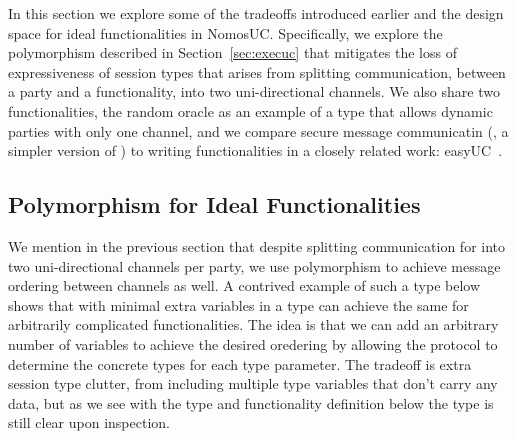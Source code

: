 In this section we explore some of the tradeoffs introduced earlier and the design space for ideal functionalities in NomosUC.
Specifically, we explore the polymorphism described in Section~\ref{sec:execuc} that mitigates the loss of expressiveness of session types that arises from splitting communication, between a party and a functionality, into two uni-directional channels.
We also share two functionalities, the random oracle \Fro as an example of a type that allows dynamic parties with only one channel, and we compare secure message communicatin (\Fsmc, a simpler version of \Fauth) to writing functionalities in a closely related work: easyUC~\cite{easyuc}.

\subsection{Polymorphism for Ideal Functionalities}
We mention in the previous section that despite splitting communication for \Fauth into two uni-directional channels per party, we use polymorphism to achieve message ordering between channels as well.
A contrived example of such a type below shows that with minimal extra variables in a type can achieve the same for arbitrarily complicated functionalities. 
The idea is that we can add an arbitrary number of variables to achieve the desired oredering by allowing the protocol to determine the concrete types for each type parameter. 
The tradeoff is extra session type clutter, from including multiple type variables that don't carry any data, but as we see with the type and functionality definition below the type is still clear upon inspection.

